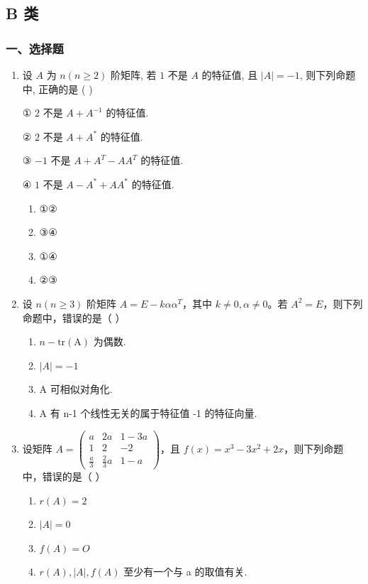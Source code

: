 \documentclass[12pt, a4paper]{ctexart}
\begin{document}
\subsection{B 类}

\subsubsection*{一、选择题}

\begin{enumerate}
    \item 设 $ A $ 为 $ n(n \geq 2) $ 阶矩阵, 若 $ 1 $ 不是 $ A $ 的特征值, 且 $ |A| = -1 $, 则下列命题中, 正确的是 ( \underline{\hspace{1cm}} )
    
    ① $ 2 $ 不是 $ A + A^{-1} $ 的特征值.
    
    ② $ 2 $ 不是 $ A + A^* $ 的特征值.
    
    ③ $ -1 $ 不是 $ A + A^T - A A^T $ 的特征值.
    
    ④ $ 1 $ 不是 $ A - A^* + A A^* $ 的特征值.
    \begin{enumerate}[label=(\Alph*)]
        \item ①②
        \item ③④
        \item ①④
        \item ②③
    \end{enumerate}

    \item 设 $ n(n \geq 3) $ 阶矩阵 $ A = E - k \alpha \alpha^{T} $，其中 $ k \neq 0, \alpha \neq 0 $。若 $ A^{2} = E $，则下列命题中，错误的是（ \underline{\hspace{1cm}} ）
    \begin{enumerate}[label=(\Alph*)]
        \item $ n - \mathrm{tr}(\mathrm{A}) $ 为偶数.
        \item $ |A| = -1 $
        \item A 可相似对角化.
        \item A 有 n-1 个线性无关的属于特征值 -1 的特征向量.
    \end{enumerate}

    \item 设矩阵 $ A=\begin{pmatrix}a&2a&1-3a\\1&2&-2\\\frac{a}{3}&\frac{2}{3}a&1-a\end{pmatrix} $，且 $ f(x)=x^{3}-3x^{2}+2x $，则下列命题中，错误的是（ \underline{\hspace{1cm}} ）
    \begin{enumerate}[label=(\Alph*)]
        \item $ r(A)=2 $
        \item $ |A|=0 $
        \item $ f(A) = O $
        \item $ r(A), |A|, f(A) $ 至少有一个与 a 的取值有关.
    \end{enumerate}


\end{enumerate}
\end{document}
